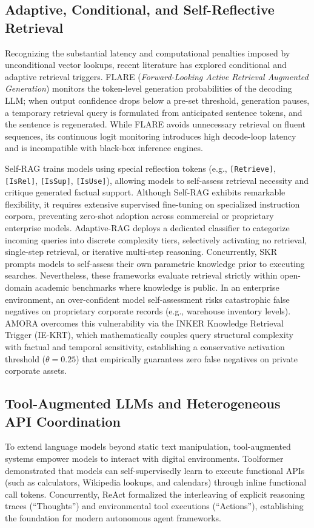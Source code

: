 \documentclass[conference,onecolumn,10pt]{IEEEtran}
\begin{document}
\subsection{Adaptive, Conditional, and Self-Reflective Retrieval}
Recognizing the substantial latency and computational penalties imposed by unconditional vector lookups, recent literature has explored conditional and adaptive retrieval triggers. FLARE (\textit{Forward-Looking Active Retrieval Augmented Generation}) \cite{jiang2023flare} monitors the token-level generation probabilities of the decoding LLM; when output confidence drops below a pre-set threshold, generation pauses, a temporary retrieval query is formulated from anticipated sentence tokens, and the sentence is regenerated. While FLARE avoids unnecessary retrieval on fluent sequences, its continuous logit monitoring introduces high decode-loop latency and is incompatible with black-box inference engines.

Self-RAG \cite{asai2023selfrag} trains models using special reflection tokens (e.g., \texttt{[Retrieve]}, \texttt{[IsRel]}, \texttt{[IsSup]}, \texttt{[IsUse]}), allowing models to self-assess retrieval necessity and critique generated factual support. Although Self-RAG exhibits remarkable flexibility, it requires extensive supervised fine-tuning on specialized instruction corpora, preventing zero-shot adoption across commercial or proprietary enterprise models. Adaptive-RAG \cite{jeong2024adaptiverag} deploys a dedicated classifier to categorize incoming queries into discrete complexity tiers, selectively activating no retrieval, single-step retrieval, or iterative multi-step reasoning. Concurrently, SKR \cite{wang2023skr} prompts models to self-assess their own parametric knowledge prior to executing searches. Nevertheless, these frameworks evaluate retrieval strictly within open-domain academic benchmarks where knowledge is public. In an enterprise environment, an over-confident model self-assessment risks catastrophic false negatives on proprietary corporate records (e.g., warehouse inventory levels). AMORA overcomes this vulnerability via the INKER Knowledge Retrieval Trigger (IE-KRT), which mathematically couples query structural complexity with factual and temporal sensitivity, establishing a conservative activation threshold ($\theta = 0.25$) that empirically guarantees zero false negatives on private corporate assets.

\subsection{Tool-Augmented LLMs and Heterogeneous API Coordination}
To extend language models beyond static text manipulation, tool-augmented systems empower models to interact with digital environments. Toolformer \cite{schick2023toolformer} demonstrated that models can self-supervisedly learn to execute functional APIs (such as calculators, Wikipedia lookups, and calendars) through inline functional call tokens. Concurrently, ReAct \cite{yao2022react} formalized the interleaving of explicit reasoning traces (``Thoughts'') and environmental tool executions (``Actions''), establishing the foundation for modern autonomous agent frameworks.
\end{document}
